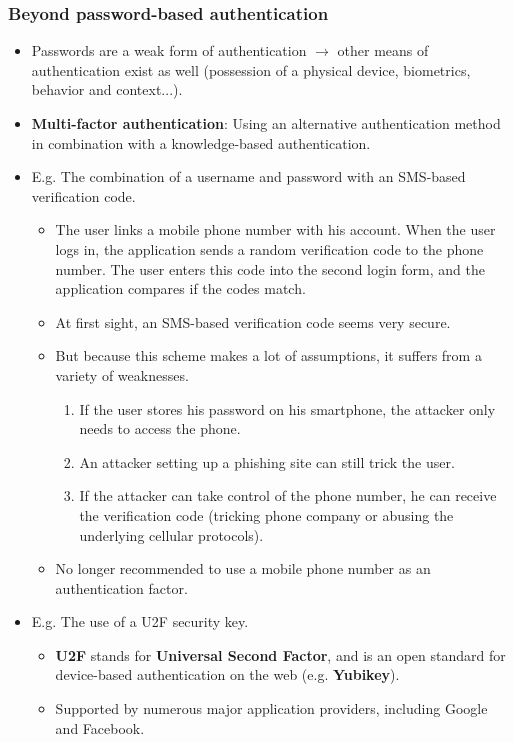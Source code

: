 \documentclass[../main.tex]{subfiles}
\begin{document}
\subsubsection{Beyond password-based authentication}
\begin{itemize}
\item Passwords are a weak form of authentication $\rightarrow$ other means of authentication exist as well (possession of a physical device, biometrics, behavior and context...).
\item \textbf{Multi-factor authentication}: Using an alternative authentication method in combination with a knowledge-based authentication.
\item E.g. The combination of a username and password with an SMS-based verification code.
\begin{itemize}
\item The user links a mobile phone number with his account. When the user logs in, the application sends a random verification code to the phone number. The user enters this code into the second login form, and the application compares if the codes match.
\item At first sight, an SMS-based verification code seems very secure.
\item But because this scheme makes a lot of assumptions, it suffers from a variety of weaknesses.
\begin{enumerate}
\item If the user stores his password on his smartphone, the attacker only needs to access the phone.
\item An attacker setting up a phishing site can still trick the user.
\item If the attacker can take control of the phone number, he can receive the verification code (tricking phone company or abusing the underlying cellular protocols).
\end{enumerate}
\item No longer recommended to use a mobile phone number as an authentication factor.
\end{itemize}
\item E.g. The use of a U2F security key.
\begin{itemize}
\item \textbf{U2F} stands for \textbf{Universal Second Factor}, and is an open standard for device-based authentication on the web (e.g. \textbf{Yubikey}).
\item Supported by numerous major application providers, including Google and Facebook.

\end{itemize}
\end{itemize}
\end{document}
